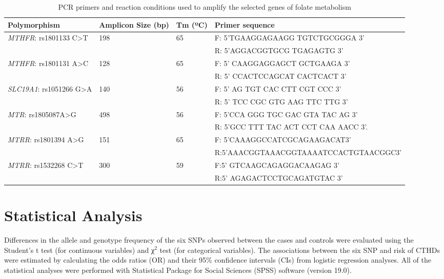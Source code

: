 \begin{refsection}
\begin{landscape}
\begin{table}[!tb]
\centering
\caption[PCR primers and reaction conditions used to amplify the selected genes of folate metabolism]{PCR primers and reaction conditions used to amplify the selected genes of folate metabolism \cite{deeparani2009detection,shaw2003genetic,galbiatti20105,zeng2011a66g}}
\label{tab:6_1}
\begin{tabular}{  l P{1in} P{0.75in} p{4.3in}  }
\toprule
	\textbf{Polymorphism} & \textbf{Amplicon Size (bp)} & \textbf{Tm (ºC)} & \textbf{Primer sequence} \\ \toprule
	\textit{MTHFR}: rs1801133 C>T & 198 & 65 & F: 5’TGAAGGAGAAGG TGTCTGCGGGA 3’ \\ 
	 &  &  & R: 5’AGGACGGTGCG TGAGAGTG 3’ \\ \midrule
	\textit{MTHFR}: rs1801131 A>C & 128 & 65 & F: 5' CAAGGAGGAGCT  GCTGAAGA 3’ \\ 
	 &  &  & R: 5' CCACTCCAGCAT CACTCACT 3’ \\ \midrule
	\textit{SLC19A1}:  rs1051266  G>A & 140 & 56 & F: 5' AG TGT CAC CTT CGT CCC 3' \\ 
	 &  &  & R: 5' TCC CGC GTG AAG TTC TTG 3' \\ \midrule
	\textit{MTR}: rs1805087A>G & 498 & 56 & F: 5’CCA GGG TGC GAC GTA TAC AG 3’ \\ 
	 &  &  & R: 5’GCC TTT TAC ACT CCT CAA AACC 3’. \\ \midrule
	\textit{MTRR}:  rs1801394 A>G & 151 & 65 & F: 5'CAAAGGCCATCGCAGAAGACAT3' \\ 
	 &  &  & R:5'AAACGGTAAACGGTAAAATCCACTGTAACGGC3' \\ \midrule
	\textit{MTRR}:  rs1532268 C>T & 300 & 59 & F:5' GTCAAGCAGAGGACAAGAG 3' \\ 
	 &  &  & R:5' AGAGACTCCTGCAGATGTAC 3' \\ \bottomrule
\end{tabular}
\end{table}
\end{landscape}

\section{Statistical Analysis}

Differences in the allele and genotype frequency of the six SNPs observed between the cases and controls were evaluated using the Student's t test (for continuous variables) and χ$^2$ test (for categorical variables). The associations between the six SNP and risk of CTHDs were estimated by calculating the odds ratios (OR) and their 95\% confidence intervals (CIs) from logistic regression analyses. All of the statistical analyses were performed with Statistical Package for Social Sciences (SPSS) software (version 19.0). 


\end{refsection}
